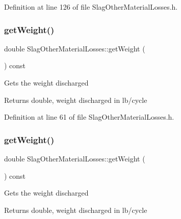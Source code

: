 Definition at line 126 of file Slag\+Other\+Material\+Losses.\+h.

\mbox{\label{class_slag_other_material_losses_a9b62b86eb4ec919d70dd8899ef5d3513}} 
\subsubsection{\texorpdfstring{get\+Weight()}{getWeight()}\hspace{0.1cm}{\footnotesize\ttfamily [1/3]}}
{\footnotesize\ttfamily double Slag\+Other\+Material\+Losses\+::get\+Weight (\begin{DoxyParamCaption}{ }\end{DoxyParamCaption}) const\hspace{0.3cm}{\ttfamily [inline]}}

Gets the weight discharged \begin{DoxyReturn}{Returns}
double, weight discharged in lb/cycle 
\end{DoxyReturn}


Definition at line 61 of file Slag\+Other\+Material\+Losses.\+h.

\mbox{\label{class_slag_other_material_losses_a9b62b86eb4ec919d70dd8899ef5d3513}} 
\subsubsection{\texorpdfstring{get\+Weight()}{getWeight()}\hspace{0.1cm}{\footnotesize\ttfamily [2/3]}}
{\footnotesize\ttfamily double Slag\+Other\+Material\+Losses\+::get\+Weight (\begin{DoxyParamCaption}{ }\end{DoxyParamCaption}) const\hspace{0.3cm}{\ttfamily [inline]}}

Gets the weight discharged \begin{DoxyReturn}{Returns}
double, weight discharged in lb/cycle 
\end{DoxyReturn}


